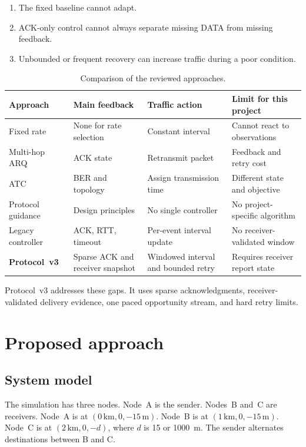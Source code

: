 \documentclass[11pt]{article}
\begin{document}
\begin{enumerate}\setlength{\itemsep}{2pt}
  \item The fixed baseline cannot adapt.
  \item ACK-only control cannot always separate missing DATA from missing feedback.
  \item Unbounded or frequent recovery can increase traffic during a poor condition.
\end{enumerate}

\begin{table}[H]
\centering\footnotesize\setlength{\tabcolsep}{3pt}
\caption{Comparison of the reviewed approaches.}\label{tab:lit-compare}
\begin{tabular}{>{\raggedright\arraybackslash}p{2.7cm} >{\raggedright\arraybackslash}p{3.3cm} >{\raggedright\arraybackslash}p{3.4cm} >{\raggedright\arraybackslash}p{4.4cm}}
\toprule
Approach & Main feedback & Traffic action & Limit for this project \\
\midrule
Fixed rate & None for rate selection & Constant interval & Cannot react to observations \\
Multi-hop ARQ~\cite{tan2007} & ACK state & Retransmit packet & Feedback and retry cost \\
ATC~\cite{guo2008} & BER and topology & Assign transmission time & Different state and objective \\
Protocol guidance~\cite{akyildiz2005,casari2011} & Design principles & No single controller & No project-specific algorithm \\
Legacy controller & ACK, RTT, timeout & Per-event interval update & No receiver-validated window \\
\textbf{Protocol~v3} & Sparse ACK and receiver snapshot & Windowed interval and bounded retry & Requires receiver report state \\
\bottomrule
\end{tabular}
\end{table}

Protocol~v3 addresses these gaps.
It uses sparse acknowledgments, receiver-validated delivery evidence, one paced opportunity stream, and hard retry limits.

\clearpage
\section{Proposed approach}\label{sec:prop}

\subsection{System model}\label{sec:prop-model}
\noindent
The simulation has three nodes.
Node~A is the sender.
Nodes~B and~C are receivers.
Node~A is at $(0\,\mathrm{km},0,-15\,\mathrm{m})$.
Node~B is at $(1\,\mathrm{km},0,-15\,\mathrm{m})$.
Node~C is at $(2\,\mathrm{km},0,-d)$, where $d$ is 15 or 1000~m.
The sender alternates destinations between B and C.
\end{document}
